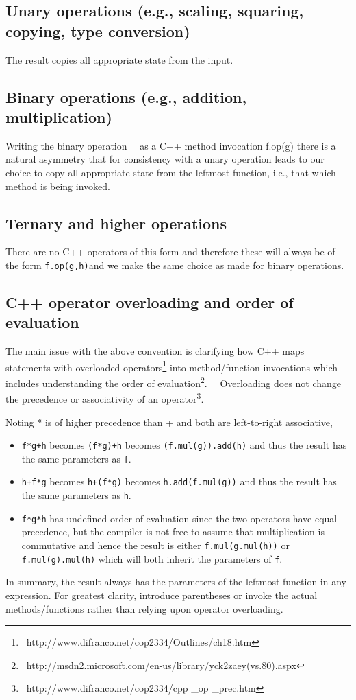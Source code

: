\documentclass[letterpaper]{book}
\begin{document}
\subsection{Unary operations (e.g., scaling, squaring, copying, type conversion)}
The result copies all appropriate state from the input.

\subsection{Binary operations (e.g., addition, multiplication)}
Writing the binary operation \ \ as a C++ method invocation f.op(g) there is a natural asymmetry that for consistency
with a unary operation leads to our choice to copy all appropriate state from the leftmost function, i.e., that which
method is being invoked.

\subsection{Ternary and higher operations}
There are no C++ operators of this form and therefore these will always be of the form \texttt{f.op(g,h)}and we make the
same choice as made for binary operations.

\subsection{C++ operator overloading and order of evaluation}
The main issue with the above convention is clarifying how C++ maps statements with overloaded
operators\footnote{\ \textrm{http://www.difranco.net/cop2334/Outlines/ch18.htm}} into method/function invocations which
includes understanding the order of
evaluation\footnote{\ \textrm{http://msdn2.microsoft.com/en-us/library/yck2zaey(vs.80).aspx}}. \ \ Overloading does not
change the precedence or associativity of an operator\footnote{\ \textrm{http://www.difranco.net/cop2334/cpp \_op
\_prec.htm}}. \ \ \ 

Noting * is of higher precedence than + and both are left-to-right associative,

\begin{itemize}
\item \texttt{f*g+h} becomes \texttt{(f*g)+h} becomes \texttt{(f.mul(g)).add(h)} and thus the result has the same
parameters as \texttt{f}.
\item \texttt{h+f*g} becomes \texttt{h+(f*g)} becomes \texttt{h.add(f.mul(g))} and thus the result has the same
parameters as \texttt{h}.
\item \texttt{f*g*h} has undefined order of evaluation since the two operators have equal precedence, but the compiler
is not free to assume that multiplication is commutative and hence the result is either \texttt{f.mul(g.mul(h))} or
\texttt{f.mul(g).mul(h)} which will both inherit the parameters of \texttt{f}.
\end{itemize}
In summary, the result always has the parameters of the leftmost function in any expression. For greatest clarity,
introduce parentheses or invoke the actual methods/functions rather than relying upon operator overloading.
\end{document}
